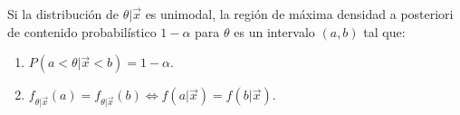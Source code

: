 \begin{note}
    Si la distribución de $\theta|\vec{x}$ es unimodal, la región de máxima densidad a posteriori de contenido probabilístico $1-\alpha$ para $\theta$ es un intervalo $(a, b)$ tal que:
    \begin{enumerate}
        \item $P(a < \theta|\vec{x} < b) = 1-\alpha$.
        \item $f_{\theta|\vec{x}}(a) = f_{\theta|\vec{x}}(b) \Leftrightarrow f(a|\vec{x}) = f(b|\vec{x})$.
    \end{enumerate}
\end{note}